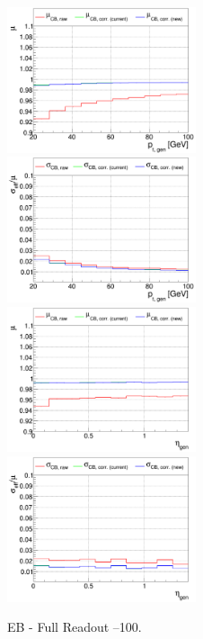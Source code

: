 \begin{figure}
\includegraphics[width=0.495\textwidth]{./plots_pdf/ECAL_plots/plotsPU/EB/FULL/pdf/GENPT/EBFULL_GENPT_0020_0100_MuOverBins.pdf}
\includegraphics[width=0.495\textwidth]{./plots_pdf/ECAL_plots/plotsPU/EB/FULL/pdf/GENPT/EBFULL_GENPT_0020_0100_EffSigmaOverBins.pdf}
\includegraphics[width=0.495\textwidth]{./plots_pdf/ECAL_plots/plotsPU/EB/FULL/pdf/GENETA/EBFULL_GENETA_0020_0100_MuOverBins.pdf}
\includegraphics[width=0.495\textwidth]{./plots_pdf/ECAL_plots/plotsPU/EB/FULL/pdf/GENETA/EBFULL_GENETA_0020_0100_EffSigmaOverBins.pdf}
\caption{EB - Full Readout --100\GeV.}
\end{figure}


